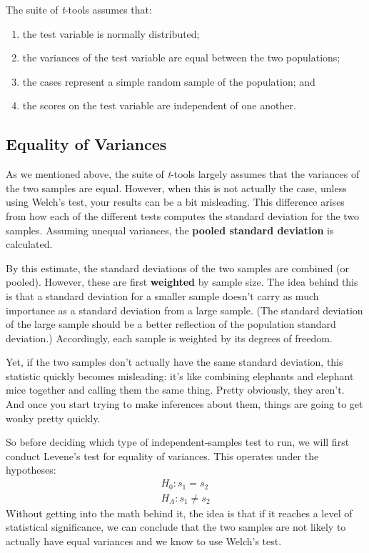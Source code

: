 The suite of \textit{t}-tools assumes that:
\begin{enumerate}
\item the test variable is normally distributed;
\item the variances of the test variable are equal between the two populations;
\item the cases represent a simple random sample of the population; and
\item the scores on the test variable are independent of one another.
\end{enumerate}

\subsection{Equality of Variances}

As we mentioned above, the suite of \textit{t}-tools largely assumes that the variances  of the two samples are equal. However, when this is not actually the case, unless using Welch's test, your results can be a bit misleading. This difference arises from how each of the different tests computes the standard deviation for the two samples. Assuming unequal variances, the \textbf{pooled standard deviation}  is calculated.

By this estimate, the standard deviations of the two samples are combined (or pooled). However, these are first \textbf{weighted} by sample size. The idea behind this is that a standard deviation for a smaller sample doesn't carry as much importance as a standard deviation from a large sample. (The standard deviation of the large sample should be a better reflection of the population standard deviation.) Accordingly, each sample is weighted by its degrees of freedom.

Yet, if the two samples don't actually have the same standard deviation, this statistic quickly becomes misleading: it's like combining elephants and elephant mice together and calling them the same thing. Pretty obviously, they aren't. And once you start trying to make inferences about them, things are going to get wonky pretty quickly.

So before deciding which type of independent-samples test to run, we will first conduct Levene's test  for equality of variances. This operates under the hypotheses:
\begin{eqnarray*}
H_0:s_1=s_2 \\
H_A:s_1\neq s_2
\end{eqnarray*}
Without getting into the math behind it, the idea is that if it reaches a level of statistical significance, we can conclude that the two samples are not likely to actually have equal variances and we know to use Welch's test.

